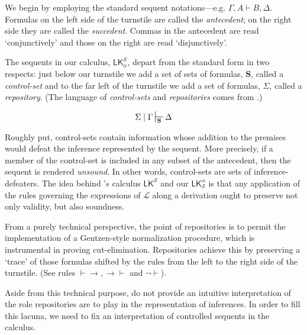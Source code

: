 \documentclass{article}                     %
\theoremstyle{theorem}
\theoremstyle{corollary}
\theoremstyle{lemma}
\theoremstyle{definition}
\theoremstyle{remark}
\theoremstyle{definition}
\theoremstyle{notation}
\theoremstyle{definition}
\theoremstyle{proposition}
\theoremstyle{definition}
\begin{document}
We begin by employing the standard sequent notations---e.g. $\Gamma, A \vdash B, \Delta $. Formulas on the left side of the turnstile are called the \textit{antecedent}; on the right side they are called the \textit{succedent}. Commas in the antecedent are read `conjunctively' and those on the right are read `disjunctively'.

The sequents in our calculus, $\mathsf{LK}^\mathcal{S}_\alpha $, depart from the standard form in two respects: just below our turnstile we add a set of sets of formulas, $\mathbf{S} $, called a \textit{control-set} and to the far left of the turnstile we add a set of formulas, $\Sigma $, called a \textit{repository}. (The language of \textit{control-sets} and \textit{repositories} comes from \textcite{Piazza2015}.)

$$ \Sigma\mid\Gamma\sststile{\mathbf{S}}{}\Delta $$

Roughly put, control-sets contain information whose addition to the premises would defeat the inference represented by the sequent.  More precisely, if a member of the control-set is included in any subset of the antecedent, then the sequent is rendered \textit{unsound}. In other words, control-sets are sets of inference-defeaters. The idea behind \textcite{Piazza2015}'s calculus $\mathsf{LK}^\mathcal{S} $ and our $\mathsf{LK}^\alpha_\mathcal{S} $ is that any application of the rules governing the expressions of $\mathcal{L}$ along a derivation ought to preserve not only validity, but also soundness.

From a purely technical perspective, the point of repositories is to permit the implementation of a Gentzen-style normalization procedure, which is instrumental in proving cut-elimination. Repositories achieve this by preserving a `trace' of those formulas shifted by the rules from the left to the right side of the turnstile. (See rules $\vdash\to, \to\vdash$ and $\neg\vdash$).

Aside from this technical purpose, \textcite{Piazza2015} do not provide an intuitive interpretation of the role repositories are to play in the representation of inferences. In order to fill this lacuna, we need to fix an interpretation of controlled sequents in the calculus. 
\end{document}
